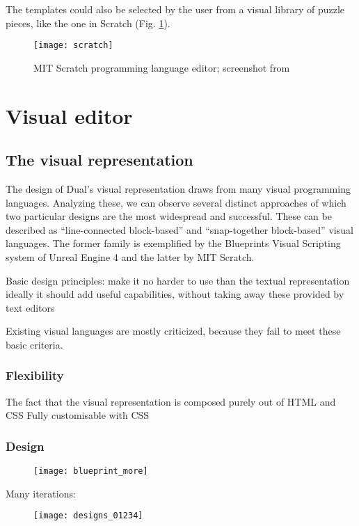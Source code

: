 The templates could also be selected by the user from a visual library of puzzle
pieces, like the one in Scratch (Fig. \ref{fig:scratch}).
\begin{figure}[h!]
\centering \texttt{[image: scratch]}
\caption{
    MIT Scratch programming language editor;
    screenshot from\protect\cite{fig_scratch}
}
\label{fig:scratch}
\end{figure}


\section{Visual editor}
\subsection{The visual representation}
The design of Dual's visual representation draws from many visual programming
languages. Analyzing these, we can observe several distinct approaches of which two particular designs are the most widespread and successful. These can be
described as ``line-connected block-based'' and ``snap-together block-based''
visual languages. The former family is exemplified by the Blueprints Visual
Scripting system of Unreal Engine 4\cite{blueprint} and the latter by MIT Scratch\cite{scratch, scratch_wikipedia}.


Basic design principles: make it no harder to use than the textual
representation ideally it should add useful capabilities, without taking away
these provided by text editors

Existing visual languages are mostly criticized, because they fail to meet these
basic criteria.

\subsubsection{Flexibility}
The fact that the visual representation is composed purely out of HTML and CSS
Fully customisable with CSS

\subsubsection{Design}
\begin{figure}[h!]
\centering \texttt{[image: blueprint\_more]}
\caption{}
\label{fig:blueprint_more}
\end{figure}

Many iterations:

\begin{figure}[h!]
\centering \texttt{[image: designs\_01234]}
\caption{}
\label{fig:designs_01234}
\end{figure}

